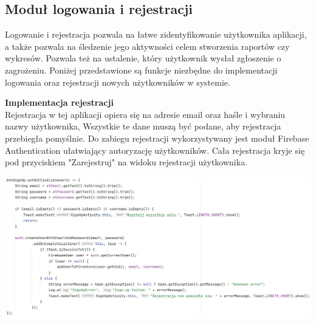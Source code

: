 \subsection{Moduł logowania i rejestracji}
Logowanie i rejestracja pozwala na łatwe zidentyfikowanie użytkownika aplikacji, a także pozwala na śledzenie jego aktywności celem stworzenia raportów czy wykresów. Pozwala też na ustalenie, który użytkownik wysłał zgłoszenie o zagrożeniu. Poniżej przedstawione są funkcje niezbędne do implementacji logowania oraz rejestracji nowych użytkowników w systemie.

\textbf{Implementacja rejestracji}\\
Rejestracja w tej aplikacji opiera się na adresie email oraz haśle i wybraniu nazwy użytkownika, Wszystkie te dane muszą być podane, aby rejestracja przebiegła pomyślnie. Do zabiegu rejestracji wykorzystywany jest moduł Firebase Authentication ułatwiający autoryzację użytkowników. Cała rejestracja kryje się pod przyciskiem "Zarejestruj" na widoku rejestracji użytkownika.\\
\noindent
\begin{minipage}{\linewidth}
    \label{lst:register}
    \centering
    \includegraphics[width=0.8\linewidth]{img/kod/imp-reje.jpg}
\end{minipage}
\\

